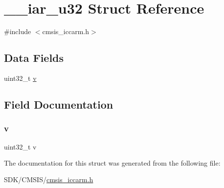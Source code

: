 \hypertarget{struct____iar__u32}{}\section{\+\_\+\+\_\+iar\+\_\+u32 Struct Reference}
\label{struct____iar__u32}


{\ttfamily \#include $<$cmsis\+\_\+iccarm.\+h$>$}

\subsection*{Data Fields}
\begin{DoxyCompactItemize}
\item 
uint32\+\_\+t \mbox{\hyperlink{struct____iar__u32_a9e0a00edabf3b8a5dafff624fff7bbfc}{v}}
\end{DoxyCompactItemize}


\subsection{Field Documentation}
\mbox{\label{struct____iar__u32_a9e0a00edabf3b8a5dafff624fff7bbfc}} 
\subsubsection{\texorpdfstring{v}{v}}
{\footnotesize\ttfamily uint32\+\_\+t v}



The documentation for this struct was generated from the following file\+:\begin{DoxyCompactItemize}
\item 
S\+D\+K/\+C\+M\+S\+I\+S/\mbox{\hyperlink{cmsis__iccarm_8h}{cmsis\+\_\+iccarm.\+h}}\end{DoxyCompactItemize}

